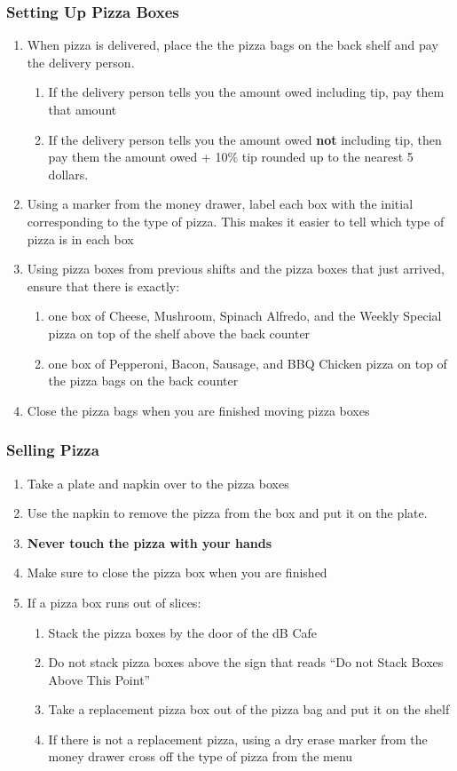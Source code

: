 \documentclass[12pt,onecolumn,letterpaper]{article}
\begin{document}
\subsubsection{Setting Up Pizza Boxes}
\begin{enumerate}
\item When pizza is delivered, place the the pizza bags on the back shelf and pay the delivery person. 
	\begin{enumerate}
	\item If the delivery person tells you the amount owed including tip, pay them that amount
	\item If the delivery person tells you the amount owed \textbf{not} including tip, then pay them the amount owed + 10\% tip rounded up to the nearest 5 dollars.
	\end{enumerate}
\item Using a marker from the money drawer, label each box with the initial corresponding to the type of pizza. This makes it easier to tell which type of pizza is in each box
\item Using pizza boxes from previous shifts and the pizza boxes that just arrived, ensure that there is exactly:
	\begin{enumerate}
	\item one box of Cheese, Mushroom, Spinach Alfredo, and the Weekly Special pizza on top of the shelf above the back counter
	\item one box of Pepperoni, Bacon, Sausage, and BBQ Chicken pizza on top of the pizza bags on the back counter
	\end{enumerate}
\item Close the pizza bags when you are finished moving pizza boxes
\end{enumerate}
\subsubsection{Selling Pizza}
\begin{enumerate}
\item Take a plate and napkin over to the pizza boxes
\item Use the napkin to remove the pizza from the box and put it on the plate.
\item \textbf{Never touch the pizza with your hands}
\item Make sure to close the pizza box when you are finished
\item If a pizza box runs out of slices:
	\begin{enumerate}
	\item Stack the pizza boxes by the door of the dB Cafe
	\item Do not stack pizza boxes above the sign that reads ``Do not Stack Boxes Above This Point''
	\item Take a replacement pizza box out of the pizza bag and put it on the shelf
	\item If there is not a replacement pizza, using a dry erase marker from the money drawer cross off the type of pizza from the menu
	\end{enumerate}
\end{enumerate}
\end{document}
